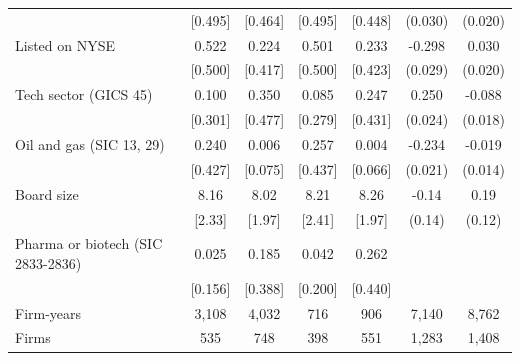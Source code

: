 \begin{tabular}{lcccccc}
 & [0.495] & [0.464] & [0.495] & [0.448] & (0.030) & (0.020) \\
Listed on NYSE & 0.522 & 0.224 & 0.501 & 0.233 & -0.298 & 0.030 \\
 & [0.500] & [0.417] & [0.500] & [0.423] & (0.029) & (0.020) \\
Tech sector (GICS 45) & 0.100 & 0.350 & 0.085 & 0.247 & 0.250 & -0.088 \\
 & [0.301] & [0.477] & [0.279] & [0.431] & (0.024) & (0.018) \\
Oil and gas (SIC 13, 29) & 0.240 & 0.006 & 0.257 & 0.004 & -0.234 & -0.019 \\
 & [0.427] & [0.075] & [0.437] & [0.066] & (0.021) & (0.014) \\
Board size & 8.16 & 8.02 & 8.21 & 8.26 & -0.14 & 0.19 \\
 & [2.33] & [1.97] & [2.41] & [1.97] & (0.14) & (0.12) \\
Pharma or biotech (SIC 2833-2836) & 0.025 & 0.185 & 0.042 & 0.262 &  &  \\
 & [0.156] & [0.388] & [0.200] & [0.440] &  &  \\
\hline
Firm-years & 3,108 & 4,032 & 716 & 906 & 7,140 & 8,762 \\
Firms & 535 & 748 & 398 & 551 & 1,283 & 1,408 \\
\hline\hline
\end{tabular}
